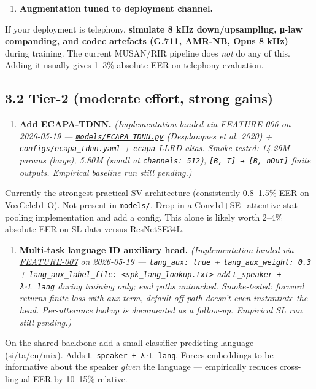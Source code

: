 \documentclass[10pt,a4paper]{article}
\begin{document}
\begin{enumerate}[leftmargin=*,itemsep=2pt]
  \item \textbf{Augmentation tuned to deployment channel.}
\end{enumerate}
If your deployment is telephony, \textbf{simulate 8 kHz down/upsampling, μ-law companding, and codec artefacts (G.711, AMR-NB, Opus 8 kHz)} during training. The current MUSAN/RIR pipeline does \textit{not} do any of this. Adding it usually gives 1--3\% absolute EER on telephony evaluation.

\subsection*{3.2 Tier-2 (moderate effort, strong gains)}

\begin{enumerate}[leftmargin=*,itemsep=2pt]
  \item \textbf{Add ECAPA-TDNN.} \textit{(Implementation landed via \href{docs/bugfixes/FEATURE-006-ecapa-tdnn.md}{FEATURE-006} on 2026-05-19 --- \href{models/ECAPA_TDNN.py}{\texttt{models/ECAPA\_TDNN.py}} (Desplanques et al. 2020) + \href{configs/ecapa_tdnn.yaml}{\texttt{configs/ecapa\_tdnn.yaml}} + \texttt{ecapa} LLRD alias. Smoke-tested: 14.26M params (large), 5.80M (small at \texttt{channels: 512}), \texttt{[B, T] → [B, nOut]} finite outputs. Empirical baseline run still pending.)}
\end{enumerate}
Currently the strongest practical SV architecture (consistently 0.8--1.5\% EER on VoxCeleb1-O). Not present in \texttt{models/}. Drop in a Conv1d+SE+attentive-stat-pooling implementation and add a config. This alone is likely worth 2--4\% absolute EER on SL data versus ResNetSE34L.

\begin{enumerate}[leftmargin=*,itemsep=2pt]
  \item \textbf{Multi-task language ID auxiliary head.} \textit{(Implementation landed via \href{docs/bugfixes/FEATURE-007-lang-aux-head.md}{FEATURE-007} on 2026-05-19 --- \texttt{lang\_aux: true} + \texttt{lang\_aux\_weight: 0.3} + \texttt{lang\_aux\_label\_file: <spk\_lang\_lookup.txt>} add \texttt{L\_speaker + λ·L\_lang} during training only; eval paths untouched. Smoke-tested: forward returns finite loss with aux term, default-off path doesn't even instantiate the head. Per-utterance lookup is documented as a follow-up. Empirical SL run still pending.)}
\end{enumerate}
On the shared backbone add a small classifier predicting language (si/ta/en/mix). Adds \texttt{L\_speaker + λ·L\_lang}. Forces embeddings to be informative about the speaker \textit{given} the language --- empirically reduces cross-lingual EER by 10--15\% relative.
\end{document}
